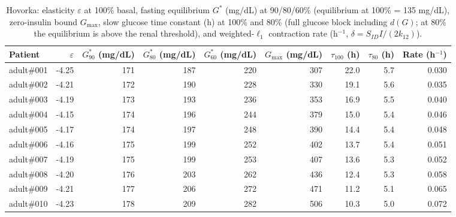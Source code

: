 \begin{table}[H]
\centering
\caption{Hovorka: elasticity $\varepsilon$ at 100\% basal, fasting equilibrium $G^*$ (mg/dL) at 90/80/60\% (equilibrium at 100\% = 135 mg/dL), zero-insulin bound $G_{\max}$, slow glucose time constant (h) at 100\% and 80\% (full glucose block including $d(G)$; at 80\% the equilibrium is above the renal threshold), and weighted-$\ell_1$ contraction rate (h$^{-1}$, $\delta=S_{ID}I/(2k_{12})$).}\label{tab:S2a}
\footnotesize
\begin{tabular}{lrrrrrrrr}
\toprule
Patient & $\varepsilon$ & $G^*_{90}$ (mg/dL) & $G^*_{80}$ (mg/dL) & $G^*_{60}$ (mg/dL) & $G_{\max}$ (mg/dL) & $\tau_{100}$ (h) & $\tau_{80}$ (h) & Rate (h$^{-1}$) \\
\midrule
adult\#001 & -4.25 & 171 & 187 & 220 & 307 & 22.0 & 5.7 & 0.030 \\
adult\#002 & -4.21 & 172 & 190 & 228 & 330 & 19.1 & 5.6 & 0.035 \\
adult\#003 & -4.19 & 173 & 193 & 236 & 353 & 16.9 & 5.5 & 0.040 \\
adult\#004 & -4.15 & 174 & 196 & 244 & 379 & 15.0 & 5.4 & 0.046 \\
adult\#005 & -4.17 & 174 & 197 & 248 & 390 & 14.4 & 5.4 & 0.048 \\
adult\#006 & -4.16 & 175 & 199 & 252 & 402 & 13.7 & 5.4 & 0.051 \\
adult\#007 & -4.19 & 175 & 199 & 253 & 407 & 13.6 & 5.3 & 0.052 \\
adult\#008 & -4.20 & 176 & 203 & 262 & 436 & 12.4 & 5.3 & 0.058 \\
adult\#009 & -4.21 & 177 & 206 & 272 & 471 & 11.2 & 5.1 & 0.065 \\
adult\#010 & -4.23 & 178 & 209 & 282 & 506 & 10.3 & 5.0 & 0.072 \\
\bottomrule
\end{tabular}
\end{table}

